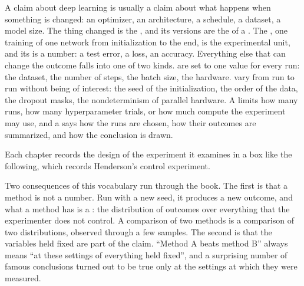 \begin{refsection}

A claim about deep learning is usually a claim about what happens when something is changed: an optimizer, an architecture, a schedule, a dataset, a model size. The thing changed is the , and its versions are the  of a . The , one training of one network from initialization to the end, is the experimental unit, and its  is a number: a test error, a loss, an accuracy. Everything else that can change the outcome falls into one of two kinds.  are set to one value for every run: the dataset, the number of steps, the batch size, the hardware.  vary from run to run without being of interest: the seed of the initialization, the order of the data, the dropout masks, the nondeterminism of parallel hardware. A  limits how many runs, how many hyperparameter trials, or how much compute the experiment may use, and a  says how the runs are chosen, how their outcomes are summarized, and how the conclusion is drawn.

Each chapter records the design of the experiment it examines in a box like the following, which records Henderson's control experiment.

\begin{experiment}
\end{experiment}

Two consequences of this vocabulary run through the book. The first is that a method is not a number. Run with a new seed, it produces a new outcome, and what a method has is a : the distribution of outcomes over everything that the experimenter does not control. A comparison of two methods is a comparison of two distributions, observed through a few samples. The second is that the variables held fixed are part of the claim. ``Method A beats method B'' always means ``at these settings of everything held fixed'', and a surprising number of famous conclusions turned out to be true only at the settings at which they were measured.


\end{refsection}
